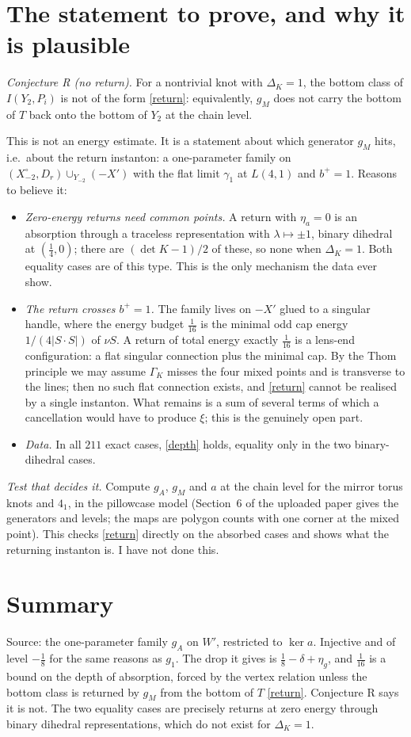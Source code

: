 \documentclass[10pt]{amsart}
\newcommand{\st}[1]{\par\noindent\textit{#1}\enspace}
\begin{document}
\section{The statement to prove, and why it is plausible}

\st{Conjecture R (no return).} For a nontrivial knot with $\Delta_K=1$, the bottom class of
$I(Y_2,P_i)$ is not of the form \eqref{return}: equivalently, $g_M$ does not carry the bottom
of $T$ back onto the bottom of $Y_2$ at the chain level.

This is not an energy estimate. It is a statement about which generator $g_M$ hits, i.e.\ about
the return instanton: a one-parameter family on $(X_{-2}^\circ,D_r)\cup_{Y_{-2}}(-X')$ with the
flat limit $\gamma_1$ at $L(4,1)$ and $b^+=1$. Reasons to believe it:
\begin{itemize}
\item \emph{Zero-energy returns need common points.} A return with $\eta_a=0$ is an absorption
through a traceless representation with $\lambda\mapsto\pm1$, binary dihedral at
$(\frac14,0)$; there are $(\det K-1)/2$ of these, so none when $\Delta_K=1$. Both equality
cases are of this type. This is the only mechanism the data ever show.
\item \emph{The return crosses $b^+=1$.} The family lives on $-X'$ glued to a singular
handle, where the energy budget $\frac1{16}$ is the minimal odd cap energy $1/(4|S\cdot S|)$
of $\nu S$. A return of total energy exactly $\frac1{16}$ is a lens-end configuration: a flat
singular connection plus the minimal cap. By the Thom principle we may assume $\Gamma_K$
misses the four mixed points and is transverse to the lines; then no such flat connection
exists, and \eqref{return} cannot be realised by a single instanton. What remains is a sum of
several terms of which a cancellation would have to produce $\xi$; this is the genuinely
open part.
\item \emph{Data.} In all $211$ exact cases, \eqref{depth} holds, equality only in the two
binary-dihedral cases.
\end{itemize}

\st{Test that decides it.} Compute $g_A$, $g_M$ and $a$ at the chain level for the mirror
torus knots and $4_1$, in the pillowcase model (Section~6 of the uploaded paper gives the
generators and levels; the maps are polygon counts with one corner at the mixed point). This
checks \eqref{return} directly on the absorbed cases and shows what the returning
instanton is. I have not done this.

\section{Summary}

Source: the one-parameter family $g_A$ on $W'$, restricted to $\ker a$. Injective and of level
$-\frac18$ for the same reasons as $g_1$. The drop it gives is $\frac18-\delta+\eta_g$, and
$\frac1{16}$ is a bound on the depth of absorption, forced by the vertex relation unless the
bottom class is returned by $g_M$ from the bottom of $T$ \eqref{return}. Conjecture R says it
is not. The two equality cases are precisely returns at zero energy through binary dihedral
representations, which do not exist for $\Delta_K=1$.
\end{document}
